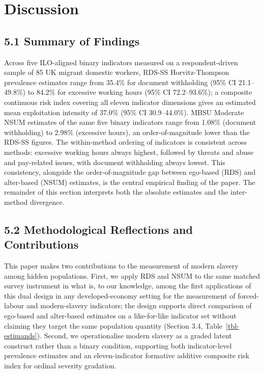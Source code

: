 \documentclass[
  12pt,
  letterpaper,
  DIV=11,
  numbers=noendperiod]{scrartcl}
\begin{document}
\section{Discussion}\label{discussion}

\subsection{5.1 Summary of Findings}\label{summary-of-findings}

Across five ILO-aligned binary indicators measured on a
respondent-driven sample of 85 UK migrant domestic workers, RDS-SS
Horvitz-Thompson prevalence estimates range from 35.4\% for document
withholding (95\% CI 21.1--49.8\%) to 84.2\% for excessive working hours
(95\% CI 72.2--93.6\%); a composite continuous risk index covering all
eleven indicator dimensions gives an estimated mean exploitation
intensity of 37.0\% (95\% CI 30.9--44.0\%). MBSU Moderate NSUM estimates
of the same five binary indicators range from 1.08\% (document
withholding) to 2.98\% (excessive hours), an order-of-magnitude lower
than the RDS-SS figures. The within-method ordering of indicators is
consistent across methods: excessive working hours always highest,
followed by threats and abuse and pay-related issues, with document
withholding always lowest. This consistency, alongside the
order-of-magnitude gap between ego-based (RDS) and alter-based (NSUM)
estimates, is the central empirical finding of the paper. The remainder
of this section interprets both the absolute estimates and the
inter-method divergence.

\subsection{5.2 Methodological Reflections and
Contributions}\label{methodological-reflections-and-contributions}

This paper makes two contributions to the measurement of modern slavery
among hidden populations. First, we apply RDS and NSUM to the same
matched survey instrument in what is, to our knowledge, among the first
applications of this dual design in any developed-economy setting for
the measurement of forced-labour and modern-slavery indicators; the
design supports direct comparison of ego-based and alter-based estimates
on a like-for-like indicator set without claiming they target the same
population quantity (Section 3.4, Table~\ref{tbl-estimands}). Second, we
operationalise modern slavery as a graded latent construct rather than a
binary condition, supporting both indicator-level prevalence estimates
and an eleven-indicator formative additive composite risk index for
ordinal severity gradation.
\end{document}
